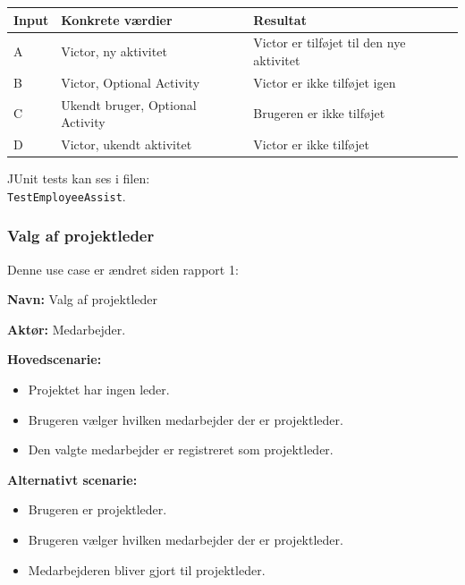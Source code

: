 \begin{table}[H]
    \centering
    \begin{tabular}{|l|l|l|}
    \hline
    \textbf{Input} &     \textbf{Konkrete værdier}              & \textbf{Resultat}                        \\ \hline
    A     & Victor, ny aktivitet  & Victor er tilføjet til den nye aktivitet    \\ \hline
    B     & Victor, Optional Activity    & Victor er ikke tilføjet igen         \\ \hline
    C     & Ukendt bruger, Optional Activity & Brugeren er ikke tilføjet        \\ \hline
    D     & Victor, ukendt aktivitet & Victor er ikke tilføjet                  \\ \hline

    \end{tabular}
    
\end{table}

JUnit tests kan ses i filen: \\
\texttt{TestEmployeeAssist}.


\subsubsection{Valg af projektleder}

Denne use case er ændret siden rapport 1:

\textbf{Navn:} Valg af projektleder

\textbf{Aktør:} Medarbejder.


\textbf{Hovedscenarie: }
    
\begin{itemize}
    \item Projektet har ingen leder.
    \item Brugeren vælger hvilken medarbejder der er projektleder.
    \item Den valgte medarbejder er registreret som projektleder.
\end{itemize}

\textbf{Alternativt scenarie:}
\begin{itemize}
    \item Brugeren er projektleder.
    \item Brugeren vælger hvilken medarbejder der er projektleder.
    \item Medarbejderen bliver gjort til projektleder.
\end{itemize}

